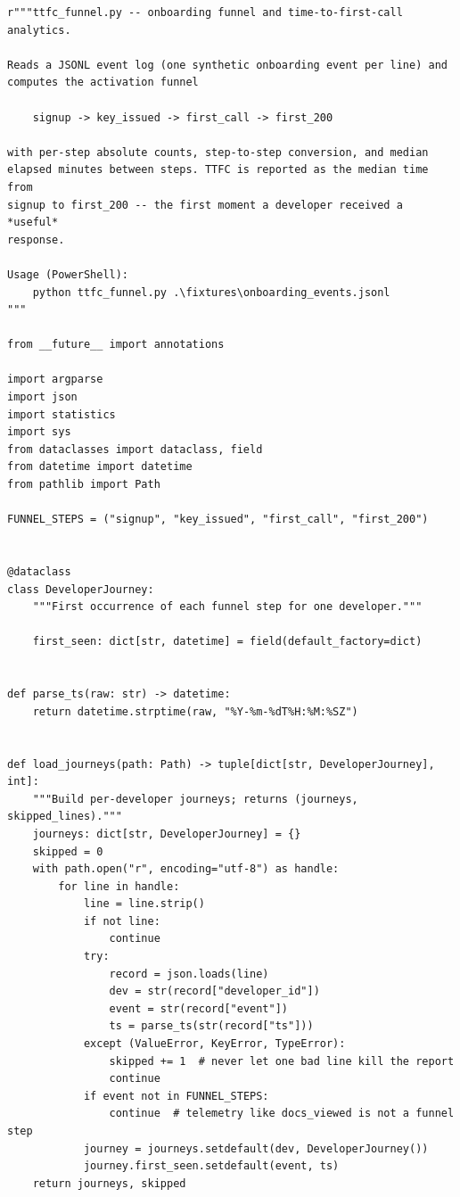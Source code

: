 \begin{verbatim}
r"""ttfc_funnel.py -- onboarding funnel and time-to-first-call analytics.

Reads a JSONL event log (one synthetic onboarding event per line) and
computes the activation funnel

    signup -> key_issued -> first_call -> first_200

with per-step absolute counts, step-to-step conversion, and median
elapsed minutes between steps. TTFC is reported as the median time from
signup to first_200 -- the first moment a developer received a *useful*
response.

Usage (PowerShell):
    python ttfc_funnel.py .\fixtures\onboarding_events.jsonl
"""

from __future__ import annotations

import argparse
import json
import statistics
import sys
from dataclasses import dataclass, field
from datetime import datetime
from pathlib import Path

FUNNEL_STEPS = ("signup", "key_issued", "first_call", "first_200")


@dataclass
class DeveloperJourney:
    """First occurrence of each funnel step for one developer."""

    first_seen: dict[str, datetime] = field(default_factory=dict)


def parse_ts(raw: str) -> datetime:
    return datetime.strptime(raw, "%Y-%m-%dT%H:%M:%SZ")


def load_journeys(path: Path) -> tuple[dict[str, DeveloperJourney], int]:
    """Build per-developer journeys; returns (journeys, skipped_lines)."""
    journeys: dict[str, DeveloperJourney] = {}
    skipped = 0
    with path.open("r", encoding="utf-8") as handle:
        for line in handle:
            line = line.strip()
            if not line:
                continue
            try:
                record = json.loads(line)
                dev = str(record["developer_id"])
                event = str(record["event"])
                ts = parse_ts(str(record["ts"]))
            except (ValueError, KeyError, TypeError):
                skipped += 1  # never let one bad line kill the report
                continue
            if event not in FUNNEL_STEPS:
                continue  # telemetry like docs_viewed is not a funnel step
            journey = journeys.setdefault(dev, DeveloperJourney())
            journey.first_seen.setdefault(event, ts)
    return journeys, skipped



\end{verbatim}
